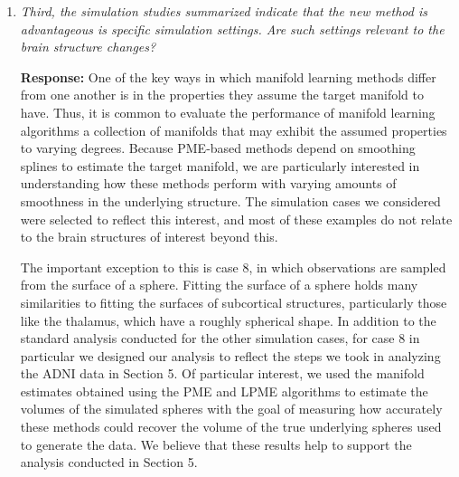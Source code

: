 \documentclass[12pt]{article}
\theoremstyle{definition}
\newcommand{\revision}[1]{\textcolor{blue}{#1}}
\begin{document}
\begin{enumerate}
{\bf Response:} The proposed method can theoretically be used in any situation in which a smoothing spline is appropriate; thus, it is applicable in a continuous time setting. To demonstrate this, we have added random variability to the time points in the simulations, creating irregular time intervals. We have also added the following comment in Section 6:

\revision{Because this method uses a smoothing spline function to estimate longitudinal change in the underlying manifold, it can be applied to cases where time points are observed at discrete intervals or are randomly sampled from a continuous time interval.}

\item  {\it Third, the simulation studies summarized indicate that the new method is advantageous is specific simulation settings. Are such settings relevant to the brain structure changes?}

{\bf Response:} One of the key ways in which manifold learning methods differ from one another is in the properties they assume the target manifold to have. Thus, it is common to evaluate the performance of manifold learning algorithms a collection of manifolds that may exhibit the assumed properties to varying degrees. Because PME-based methods depend on smoothing splines to estimate the target manifold, we are particularly interested in understanding how these methods perform with varying amounts of smoothness in the underlying structure. The simulation cases we considered were selected to reflect this interest, and most of these examples do not relate to the brain structures of interest beyond this.

The important exception to this is case 8, in which observations are sampled from the surface of a sphere. Fitting the surface of a sphere holds many similarities to fitting the surfaces of subcortical structures, particularly those like the thalamus, which have a roughly spherical shape. In addition to the standard analysis conducted for the other simulation cases, for case 8 in particular we designed our analysis to reflect the steps we took in analyzing the ADNI data in Section 5. Of particular interest, we used the manifold estimates obtained using the PME and LPME algorithms to estimate the volumes of the simulated spheres with the goal of measuring how accurately these methods could recover the volume of the true underlying spheres used to generate the data. We believe that these results help to support the analysis conducted in Section 5.


\end{enumerate}
\end{document}
